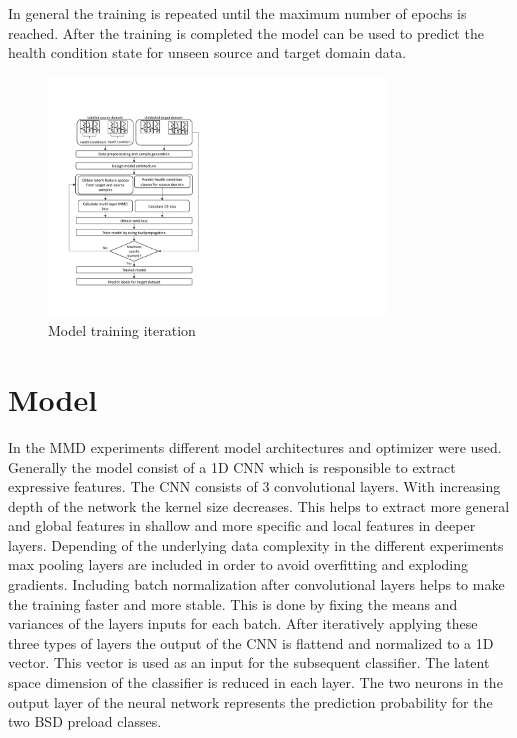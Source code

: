 In general the training is repeated until the maximum number of epochs is reached. After the training is completed the model can be used to predict the health condition state for unseen source and target domain data. 

\begin{figure}[htpb]
  \centering
  \includegraphics[width=0.8\textwidth]{training_process_mmd.pdf}
  \caption {Model training iteration} \label{fig:Training_Process_MMD}
\end{figure}


\section{Model}
In the MMD experiments different model architectures and optimizer were used. Generally the model consist of a 1D CNN which is responsible to extract expressive features. The CNN consists of 3 convolutional layers. With increasing depth of the network the kernel size decreases. This helps to extract more general and global features in shallow and more specific and local features in deeper layers. Depending of the underlying data complexity in the different experiments max pooling layers are included in order to avoid overfitting and exploding gradients. Including batch normalization after convolutional layers helps to make the training faster and more stable. This is done by fixing the means and variances of the layers inputs for each batch. After iteratively applying these three types of layers the output of the CNN is flattend and normalized to a 1D vector. This vector is used as an input for the subsequent classifier. The latent space dimension  of the classifier is reduced in each layer. The two neurons in the output layer of the neural network represents the prediction probability for the two BSD preload classes.

